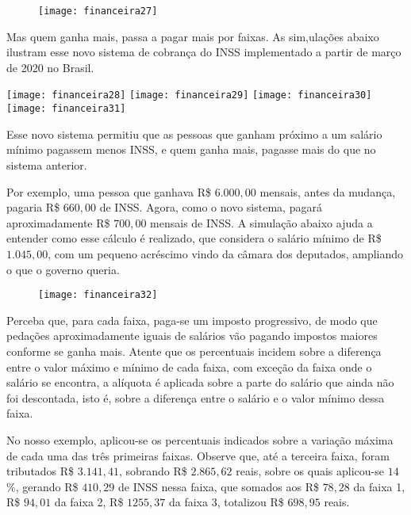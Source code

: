 \begin{figure}[H]
\centering

\texttt{[image: financeira27]}
\end{figure}

Mas quem ganha mais, passa a pagar mais por faixas. As sim,ulações abaixo ilustram esse novo sistema de cobrança do INSS implementado a partir de março de 2020 no Brasil.

\begin{multicols}{2}
\setlength{\columnsep}{-10pt}
\texttt{[image: financeira28]}
\texttt{[image: financeira29]}
\texttt{[image: financeira30]}
\texttt{[image: financeira31]}
\end{multicols}


Esse novo sistema permitiu que as pessoas que ganham próximo a um salário mínimo pagassem menos INSS, e quem ganha mais, pagasse mais do que no sistema anterior.

Por exemplo, uma pessoa que ganhava R\$ $6.000{,}00$ mensais, antes da mudança, pagaria R\$ $660{,}00$ de INSS. Agora, como o novo sistema, pagará aproximadamente R\$ $700{,}00$ mensais de INSS. A simulação abaixo ajuda a entender como esse cálculo é realizado, que considera o salário mínimo de R\$ $1.045{,}00$, com um pequeno acréscimo vindo da câmara dos deputados, ampliando o que o governo queria.

\begin{figure}[H]
\centering

\texttt{[image: financeira32]}
\end{figure}

Perceba que, para cada faixa, paga-se um imposto progressivo, de modo que pedações aproximadamente iguais de salários vão pagando impostos maiores conforme se ganha mais. Atente que os percentuais incidem sobre a diferença entre o valor máximo e mínimo de cada faixa, com exceção da faixa onde o salário se encontra, a alíquota é aplicada sobre a parte do salário que ainda não foi descontada, isto é, sobre a diferença entre o salário e o valor mínimo dessa faixa.

No nosso exemplo, aplicou-se os percentuais indicados sobre a variação máxima de cada uma das três primeiras faixas. Observe que, até a terceira faixa, foram tributados R\$ $3.141{,}41$, sobrando R\$ $2.865{,}62$ reais, sobre os quais aplicou-se $14$\%, gerando R\$ $410{,}29$ de INSS nessa faixa, que somados aos R\$ $78{,}28$ da faixa 1, R\$ $94{,}01$ da faixa 2, R\$ $1255{,}37$ da faixa 3, totalizou R\$ $698{,}95$ reais.


